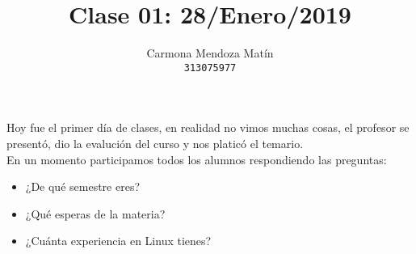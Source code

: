 \documentclass[11pt, a4paper]{report}
\begin{document}
\title{Clase 01: 28/Enero/2019}
\author{
  Carmona Mendoza Mat\'in\\
  \texttt{313075977}
}
\date{}
\maketitle

Hoy fue el primer d\'ia de clases, en realidad no vimos muchas cosas, el
profesor se present\'o, dio la evaluci\'on del curso y nos platic\'o el
temario.\\

En un momento participamos todos los alumnos respondiendo las preguntas:

\begin{itemize}
\item ¿De qu\'e semestre eres?
\item ¿Qu\'e esperas de la materia?
\item ¿Cu\'anta experiencia en Linux tienes?
\end{itemize}
\end{document}
